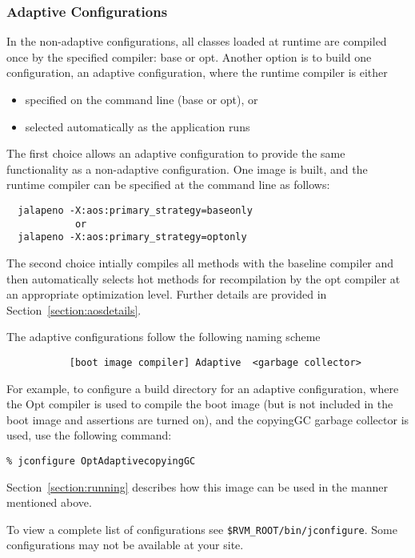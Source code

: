 \subsubsection{Adaptive Configurations} \label{adaptive-configs}
In the non-adaptive configurations, all classes
loaded at runtime are compiled once by the specified
compiler: base or opt.  Another option is to build one configuration,
an adaptive configuration,
where the runtime compiler is either
\begin{itemize}
\item specified on the command line (base or opt), or
\item selected automatically as the application runs
\end{itemize}

The first choice allows an adaptive configuration to provide the same
functionality as a non-adaptive configuration.  One image is built,
and the runtime compiler can be specified at the command line as
follows:
\begin{verbatim}
  jalapeno -X:aos:primary_strategy=baseonly
            or
  jalapeno -X:aos:primary_strategy=optonly
\end{verbatim}

The second choice intially compiles all methods with the
baseline compiler and then automatically selects hot methods for
recompilation by the opt compiler at an appropriate optimization
level. Further details are provided in Section~\ref{section:aosdetails}.

The adaptive configurations follow the following naming scheme
\begin{verbatim}
           [boot image compiler] Adaptive  <garbage collector>
\end{verbatim}

For example, to configure a build 
directory for an adaptive configuration, where the Opt compiler is 
used to compile the boot image (but is not included in the boot image
and assertions are turned on), and the copyingGC garbage collector is
used, use the following command:

\begin{verbatim}
% jconfigure OptAdaptivecopyingGC
\end{verbatim}

Section~\ref{section:running} describes how this image can be used in
the manner mentioned above.

To view a complete list of configurations see 
{\tt \$RVM\_ROOT/bin/jconfigure}.
Some configurations may not be available at your site. 

